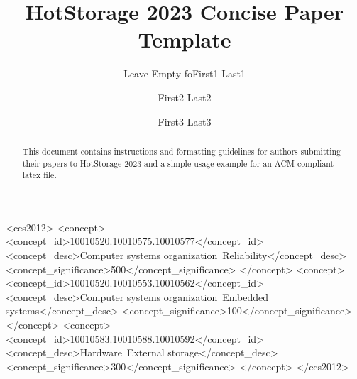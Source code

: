 \documentclass[sigconf,anonymous,10pt]{acmart}
\begin{document}
\title{HotStorage 2023 Concise Paper Template}

\author{Leave Empty foFirst1 Last1}

\author{First2 Last2}

\author{First3 Last3}

\renewcommand{\shortauthors}{F. Last1 et al.}

\begin{abstract}
This document contains instructions and formatting guidelines
for authors submitting their papers to HotStorage 2023 and a simple usage example for an ACM compliant latex file.
\end{abstract}


%
%
\begin{CCSXML}
<ccs2012>
<concept>
<concept_id>10010520.10010575.10010577</concept_id>
<concept_desc>Computer systems organization~Reliability</concept_desc>
<concept_significance>500</concept_significance>
</concept>
<concept>
<concept_id>10010520.10010553.10010562</concept_id>
<concept_desc>Computer systems organization~Embedded systems</concept_desc>
<concept_significance>100</concept_significance>
</concept>
<concept>
<concept_id>10010583.10010588.10010592</concept_id>
<concept_desc>Hardware~External storage</concept_desc>
<concept_significance>300</concept_significance>
</concept>
</ccs2012>
\end{CCSXML}


\end{document}
